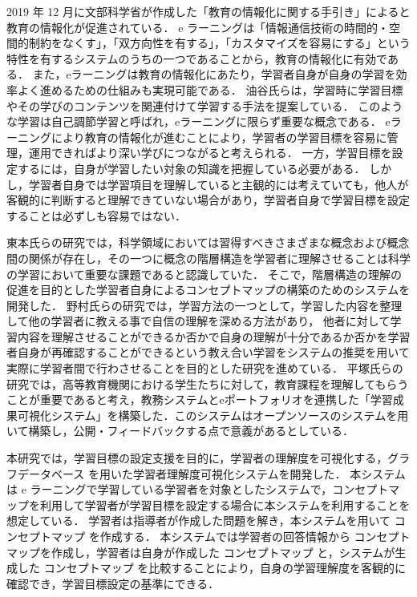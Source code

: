 \begin{titlepage}

    2019 年 12 月に文部科学省が作成した「教育の情報化に関する手引き」\cite{tebiki}によると教育の情報化が促進されている．
    e ラーニング\cite{e}は「情報通信技術の時間的・空間的制約をなくす」，「双方向性を有する」，「カスタマイズを容易にする」という特性を有するシステムのうちの一つであることから，教育の情報化に有効である．
    また，eラーニングは教育の情報化にあたり，学習者自身が自身の学習を効率よく進めるための仕組みも実現可能である．
    油谷氏らは，学習時に学習目標やその学びのコンテンツを関連付けて学習する手法を提案している\cite{seman}．
    このような学習は自己調節学習と呼ばれ，eラーニングに限らず重要な概念である\cite{jikotyou}．
    eラーニングにより教育の情報化が進むことにより，学習者の学習目標を容易に管理，運用できればより深い学びにつながると考えられる．
    一方，学習目標を設定するには，自身が学習したい対象の知識を把握している必要がある．
    しかし，学習者自身では学習項目を理解していると主観的には考えていても，他人が客観的に判断すると理解できていない場合があり，学習者自身で学習目標を設定することは必ずしも容易ではない．

    東本氏らの研究では，科学領域においては習得すべきさまざまな概念および概念間の関係が存在し，その一つに概念の階層構造を学習者に理解させることは科学の学習において重要な課題であると認識していた．
    そこで，階層構造の理解の促進を目的とした学習者自身によるコンセプトマップ\cite{concept}の構築のためのシステムを開発した\cite{toumoto}．
    野村氏らの研究では，学習方法の一つとして，学習した内容を整理して他の学習者に教える事で自信の理解を深める方法があり，
    他者に対して学習内容を理解させることができるか否かで自身の理解が十分であるか否かを学習者自身が再確認することができるという教え合い学習をシステムの推奨を用いて実際に学習者間で行わさせることを目的とした研究を進めている\cite{nomura}．
    平塚氏らの研究では，高等教育機関における学生たちに対して，教育課程を理解してもらうことが重要であると考え，教務システムとeポートフォリオを連携した「学習成果可視化システム」を構築した．このシステムはオープンソースのシステムを用いて構築し，公開・フィードバックする点で意義があるとしている\cite{hira}．

    本研究では，学習目標の設定支援を目的に，学習者の理解度を可視化する，グラフデータベース を用いた学習者理解度可視化システムを開発した．
    本システムは e ラーニングで学習している学習者を対象としたシステムで，コンセプトマップを利用して学習者が学習目標を設定する場合に本システムを利用することを想定している．
    学習者は指導者が作成した問題を解き，本システムを用いて コンセプトマップ を作成する．
    本システムでは学習者の回答情報から コンセプトマップを作成し，学習者は自身が作成した コンセプトマップ と，システムが生成した コンセプトマップ を比較することにより，自身の学習理解度を客観的に確認でき，学習目標設定の基準にできる．
    

\end{titlepage}
